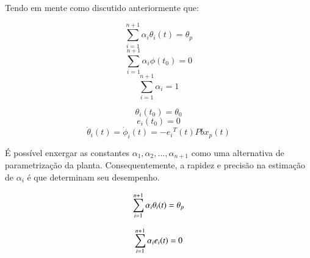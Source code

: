 \documentclass[aspectratio=169]{beamer}
\begin{document}
\begin{frame}

Tendo em mente como discutido anteriormente que:


\centering
\begin{minipage}{.48\textwidth}
  \flushleft
\begin{equation*}
\sum_{i=1}^{n+1}\alpha_i\theta_i(t) = \theta_p
\end{equation*}
\begin{equation*}
\sum_{i=1}^{n+1}\alpha_i\phi(t_0)=0
\end{equation*}
\begin{equation*}
\sum_{i=1}^{n+1}\alpha_i = 1
\end{equation*}
\end{minipage}%
  \hfill
\begin{minipage}{.48\textwidth}
  \flushright


\begin{equation*}
\theta_i(t_0) = \theta_{0}
\end{equation*}
\begin{equation*}
e_i(t_0)=0
\end{equation*}
\begin{equation*}
\dot{\theta}_i(t) = \dot{\phi}_i(t) = -{e_i}^T(t)Pbx_p(t)
\end{equation*}

\end{minipage}


\end{frame}


\begin{frame}

É possível enxergar as constantes $\alpha_1,\alpha_2,...,\alpha_{n+1}$ como uma alternativa de parametrização da planta. Consequentemente, a rapidez e precisão na estimação de $\alpha_i$ é que determinam seu desempenho.\\
\centering
\begin{minipage}{.48\textwidth}
  \centering
  \begin{equation*}
  \sum_{i=1}^{n+1}\alpha_i\theta_i(t) = \theta_p \space 
  \end{equation*}
\end{minipage}%
  \hfill

\begin{minipage}{.48\textwidth}
  \centering
    \begin{equation*}
    \sum_{i=1}^{n+1}\alpha_i e_i(t) = 0 \space
    \end{equation*}
\end{minipage}

\end{frame}
\end{document}
